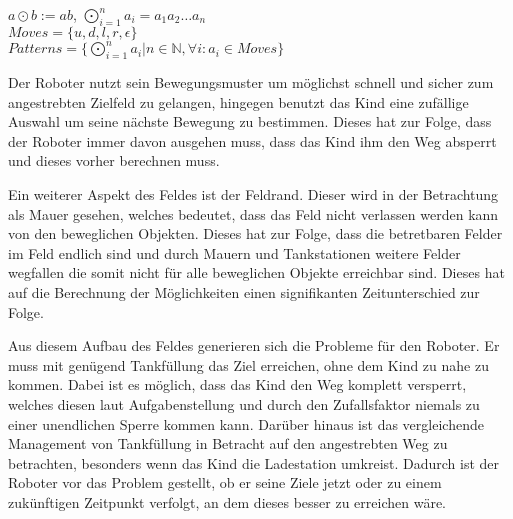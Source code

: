 \begin{center}
	$a\odot b := ab$, $\bigodot\limits_{i=1}^n a_i = a_1a_2 \dots a_n$\\
	$Moves = \{u, d, l, r, \epsilon\}$\\
	$Patterns = \{\bigodot\limits_{i=1}^n a_i | n \in \mathbb{N}, \forall i : a_i \in Moves\}$
\end{center}

\par
Der Roboter nutzt sein Bewegungsmuster um möglichst schnell und sicher zum angestrebten Zielfeld zu gelangen, hingegen benutzt das Kind eine zufällige Auswahl um seine nächste Bewegung zu bestimmen. Dieses hat zur Folge, dass der Roboter immer davon ausgehen muss, dass das Kind ihm den Weg absperrt und dieses vorher berechnen muss. \par
Ein weiterer Aspekt des Feldes ist der Feldrand. Dieser wird in der Betrachtung als Mauer gesehen, welches bedeutet, dass das Feld nicht verlassen werden kann von den beweglichen Objekten. Dieses hat zur Folge, dass die betretbaren Felder im Feld endlich sind und durch Mauern und Tankstationen weitere Felder wegfallen die somit nicht für alle beweglichen Objekte erreichbar sind. Dieses hat auf die Berechnung der Möglichkeiten einen signifikanten Zeitunterschied zur Folge. \par
Aus diesem Aufbau des Feldes generieren sich die Probleme für den Roboter. Er muss mit genügend Tankfüllung das Ziel erreichen, ohne dem Kind zu nahe zu kommen. Dabei ist es möglich, dass das Kind den Weg komplett versperrt, welches diesen laut Aufgabenstellung und durch den Zufallsfaktor niemals zu einer unendlichen Sperre kommen kann. Darüber hinaus ist das vergleichende Management von Tankfüllung in Betracht auf den angestrebten Weg zu betrachten, besonders wenn das Kind die Ladestation umkreist. Dadurch ist der Roboter vor das Problem gestellt, ob er seine Ziele jetzt oder zu einem zukünftigen Zeitpunkt verfolgt, an dem dieses besser zu erreichen wäre.

